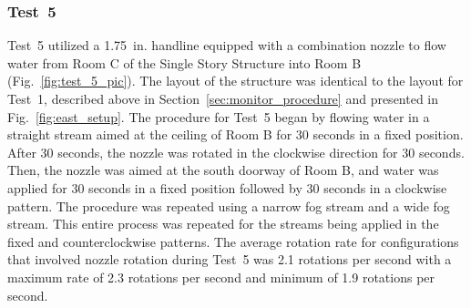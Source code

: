 \documentclass[12pt,oneside]{book}
\begin{document}
\subsubsection{Test~5}
Test~5 utilized a 1.75~in. handline equipped with a combination nozzle to flow water from Room C of the Single Story Structure into Room B (Fig.~\ref{fig:test_5_pic}). The layout of the structure was identical to the layout for Test~1, described above in Section~\ref{sec:monitor_procedure} and presented in Fig.~\ref{fig:east_setup}. The procedure for Test~5 began by flowing water in a straight stream aimed at the ceiling of Room B for 30 seconds in a fixed position. After 30 seconds, the nozzle was rotated in the clockwise direction for 30 seconds. Then, the nozzle was aimed at the south doorway of Room B, and water was applied for 30 seconds in a fixed position followed by 30 seconds in a clockwise pattern. The procedure was repeated using a narrow fog stream and a wide fog stream. This entire process was repeated for the streams being applied in the fixed and counterclockwise patterns. The average rotation rate for configurations that involved nozzle rotation during Test~5 was 2.1 rotations per second with a maximum rate of 2.3 rotations per second and minimum of 1.9 rotations per second. 
\end{document}

